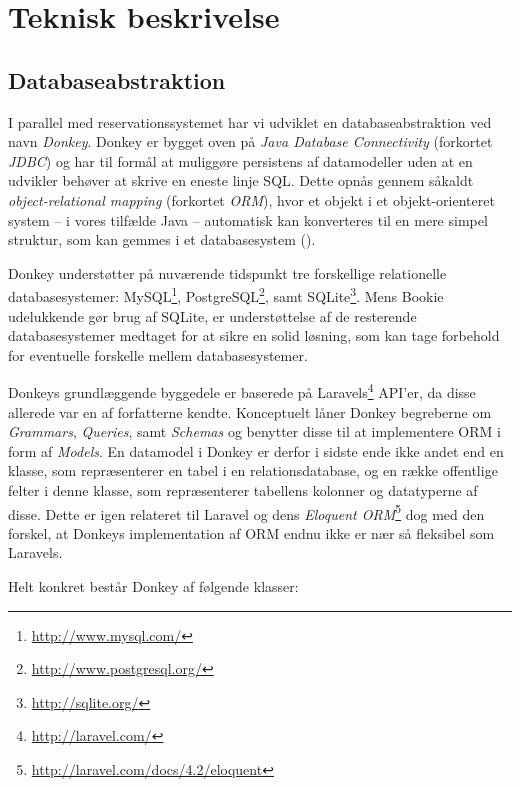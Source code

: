 \chapter{Teknisk beskrivelse}

\section{Databaseabstraktion}

I parallel med reservationssystemet har vi udviklet en databaseabstraktion ved navn \textit{Donkey}. Donkey er bygget oven på \textit{Java Database Connectivity} (forkortet \textit{JDBC}) og har til formål at muliggøre persistens af datamodeller uden at en udvikler behøver at skrive en eneste linje SQL. Dette opnås gennem såkaldt \textit{object-relational mapping} (forkortet \textit{ORM}), hvor et objekt i et objekt-orienteret system – i vores tilfælde Java – automatisk kan konverteres til en mere simpel struktur, som kan gemmes i et databasesystem (\cite{wiki:orm}).

Donkey understøtter på nuværende tidspunkt tre forskellige relationelle databasesystemer: MySQL\footnote{\url{http://www.mysql.com/}}, PostgreSQL\footnote{\url{http://www.postgresql.org/}}, samt SQLite\footnote{\url{http://sqlite.org/}}. Mens Bookie udelukkende gør brug af SQLite, er understøttelse af de resterende databasesystemer medtaget for at sikre en solid løsning, som kan tage forbehold for eventuelle forskelle mellem databasesystemer.

Donkeys grundlæggende byggedele er baserede på Laravels\footnote{\url{http://laravel.com/}} API'er, da disse allerede var en af forfatterne kendte. Konceptuelt låner Donkey begreberne om \textit{Grammars}, \textit{Queries}, samt \textit{Schemas} og benytter disse til at implementere ORM i form af \textit{Models}. En datamodel i Donkey er derfor i sidste ende ikke andet end en klasse, som repræsenterer en tabel i en relationsdatabase, og en række offentlige felter i denne klasse, som repræsenterer tabellens kolonner og datatyperne af disse. Dette er igen relateret til Laravel og dens \textit{Eloquent ORM}\footnote{\url{http://laravel.com/docs/4.2/eloquent}} dog med den forskel, at Donkeys implementation af ORM endnu ikke er nær så fleksibel som Laravels.

Helt konkret består Donkey af følgende klasser:

